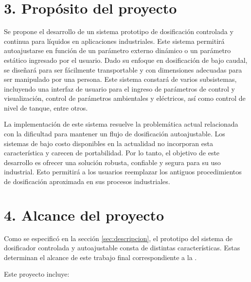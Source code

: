 \documentclass[
11pt, %
]{charter}
\begin{document}
\section{3. Propósito del proyecto}
\label{sec:proposito}

Se propone el desarrollo de un sistema prototipo de dosificación controlada y continua para líquidos en aplicaciones industriales. Este sistema permitirá autoajustarse en función de un parámetro externo dinámico o un parámetro estático ingresado por el usuario. Dado su enfoque en dosificación de bajo caudal, se diseñará para ser fácilmente transportable y con dimensiones adecuadas para ser manipulado por una persona. Este sistema constará de varios subsistemas, incluyendo una interfaz de usuario para el ingreso de parámetros de control y visualización, control de parámetros ambientales y eléctricos, así como control de nivel de tanque, entre otros.

La implementación de este sistema resuelve la problemática actual relacionada con la dificultad para mantener un flujo de dosificación autoajustable. Los sistemas de bajo costo disponibles en la actualidad no incorporan esta característica y carecen de portabilidad. Por lo tanto, el objetivo de este desarrollo es ofrecer una solución robusta, confiable y segura para su uso industrial. Esto permitirá a los usuarios reemplazar los antiguos procedimientos de dosificación aproximada en sus procesos industriales.

\section{4. Alcance del proyecto}
\label{sec:alcance}

Como se especificó en la sección \ref{sec:descripcion}, el prototipo del sistema de dosificador controlada y autoajustable consta de distintas características. Estas determinan el alcance de este trabajo final correspondiente a la  \degreename\hspace{1px}.

Este proyecto incluye:
\end{document}
